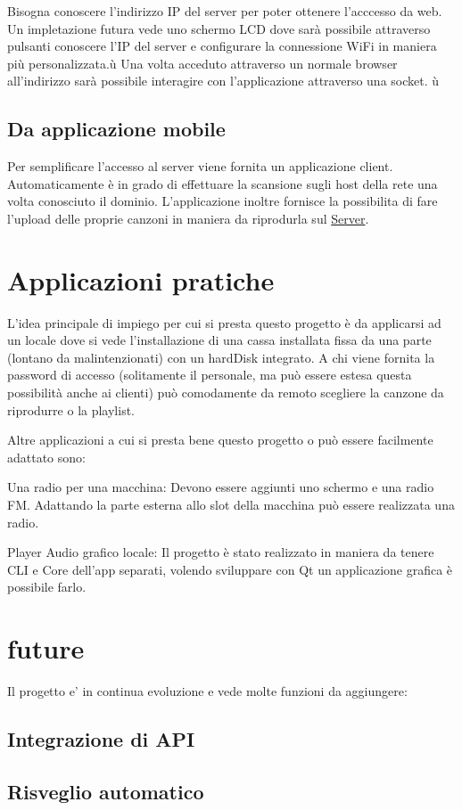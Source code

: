 \-Bisogna conoscere l'indirizzo \-I\-P del server per poter ottenere l'acccesso da web. \-Un impletazione futura vede uno schermo \-L\-C\-D dove sarà possibile attraverso pulsanti conoscere l'\-I\-P del server e configurare la connessione \-Wi\-Fi in maniera più personalizzata.\-ù \-Una volta acceduto attraverso un normale browser all'indirizzo sarà possibile interagire con l'applicazione attraverso una socket. ù \hypertarget{index_fromApp}{}\subsection{\-Da applicazione mobile}\label{index_fromApp}
\-Per semplificare l'accesso al server viene fornita un applicazione client. \-Automaticamente è in grado di effettuare la scansione sugli host della rete una volta conosciuto il dominio. \-L'applicazione inoltre fornisce la possibilita di fare l'upload delle proprie canzoni in maniera da riprodurla sul \hyperlink{classServer}{\-Server}. \hypertarget{index_praticalUse}{}\section{\-Applicazioni pratiche}\label{index_praticalUse}
\-L'idea principale di impiego per cui si presta questo progetto è da applicarsi ad un locale dove si vede l'installazione di una cassa installata fissa da una parte (lontano da malintenzionati) con un hard\-Disk integrato. \-A chi viene fornita la password di accesso (solitamente il personale, ma può essere estesa questa possibilità anche ai clienti) può comodamente da remoto scegliere la canzone da riprodurre o la playlist.

\-Altre applicazioni a cui si presta bene questo progetto o può essere facilmente adattato sono\-:
\begin{DoxyItemize}
\item \-Una radio per una macchina\-: \-Devono essere aggiunti uno schermo e una radio \-F\-M. \-Adattando la parte esterna allo slot della macchina può essere realizzata una radio.
\item \-Player \-Audio grafico locale\-: \-Il progetto è stato realizzato in maniera da tenere \-C\-L\-I e \-Core dell'app separati, volendo sviluppare con \-Qt un applicazione grafica è possibile farlo. \par
 
\end{DoxyItemize}\hypertarget{index_Funzionalità}{}\section{future}\label{index_Funzionalità}
\-Il progetto e' in continua evoluzione e vede molte funzioni da aggiungere\-: \hypertarget{index_apiIntegration}{}\subsection{\-Integrazione di A\-P\-I}\label{index_apiIntegration}
\hypertarget{index_automaticWakeUp}{}\subsection{\-Risveglio automatico}\label{index_automaticWakeUp}

